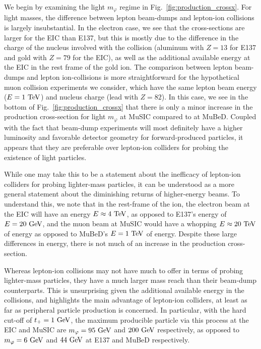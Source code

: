 We begin by examining the light $m_\varphi$ regime in Fig.~\ref{fig:production_crossx}. For light masses, the difference between lepton beam-dumps and lepton-ion collisions is largely insubstantial. In the electron case, we see that the cross-sections are larger for the EIC than E137, but this is mostly due to the difference in the charge of the nucleus involved with the collision (aluminum with $Z = 13$ for E137 and gold with $Z = 79$ for the EIC), as well as the additional available energy at the EIC in the rest frame of the gold ion. The comparison between lepton beam-dumps and lepton ion-collisions is more straightforward for the hypothetical muon collision experiments we consider, which have the same lepton beam energy ($E = 1~{\rm TeV}$) and nucleus charge (lead with $Z = 82$). In this case, we see in the bottom of Fig.~\ref{fig:production_crossx} that there is only a minor increase in the production cross-section for light $m_\varphi$ at MuSIC compared to at MuBeD. Coupled with the fact that beam-dump experiments will most definitely have a higher luminosity and favorable detector geometry for forward-produced particles, it appears that they are preferable over lepton-ion colliders for probing the existence of light particles. 

While one may take this to be a statement about the inefficacy of lepton-ion colliders for probing lighter-mass particles, it can be understood as a more general statement about the diminishing returns of higher-energy beams. To understand this, we note that in the rest-frame of the ion, the electron beam at the EIC will have an energy $E \approx 4~{\rm TeV}$, as opposed to E137's energy of $E = 20~{\rm GeV}$, and the muon beam at MuSIC would have a whopping $E \approx 20~{\rm TeV}$ of energy as opposed to MuBeD's $E = 1~{\rm TeV}$ of energy. Despite these large differences in energy, there is not much of an increase in the production cross-section.

Whereas lepton-ion collisions may not have much to offer in terms of probing lighter-mass particles, they have a much larger mass reach than their beam-dump counterparts. This is unsurprising given the additional available energy in the collisions, and highlights the main advantage of lepton-ion colliders, at least as far as peripheral particle production is concerned. In particular, with the hard cut-off of $t_+ = 1~{\rm GeV}$, the maximum producible particle via this process at the EIC and MuSIC are $m_\varphi = 95~{\rm GeV}$ and $200~{\rm GeV}$ respectively, as opposed to $m_\varphi = 6~{\rm GeV}$ and $44~{\rm GeV}$ at E137 and MuBeD respectively. 

